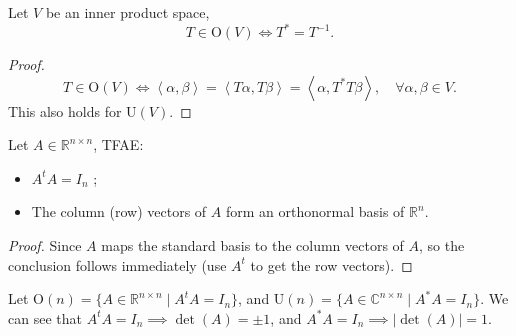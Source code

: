\begin{proposition}
	Let $V$ be an inner product space,
	\[
		T\in \mathrm{O}(V)\iff T^* = T^{-1}.
	\]
\end{proposition}
\begin{proof}[Proof]
    \[
    T\in \mathrm{O}(V) \iff \left<\alpha, \beta \right> =
	\left<T\alpha, T\beta \right> = \left<\alpha, T^*T\beta \right>,
	\quad \forall \alpha, \beta \in V.
    \]
	This also holds for $\mathrm{U}(V)$.
\end{proof}
\begin{proposition}
	Let $A\in \mathbb{R}^{n\times n}$, TFAE:
	\begin{itemize}
		\item $A^tA = I_n$ ;
		\item The column (row) vectors of $A$ form
			an orthonormal basis of $\mathbb{R}^n$.
	\end{itemize}
\end{proposition}
\begin{proof}[Proof]
    Since $A$ maps the standard basis to the column vectors of $A$,
	so the conclusion follows immediately (use $A^t$ to get the row vectors).
\end{proof}

Let $\mathrm{O}(n) = \{A\in \mathbb{R}^{n\times n}\mid A^tA = I_n\}$,
and $\mathrm{U}(n) = \{A\in \mathbb{C}^{n\times n} \mid A^*A = I_n\}$.
We can see that $A^tA = I_n \implies \det(A) = \pm 1$,
and $A^*A = I_n \implies |\det(A)| = 1$.
